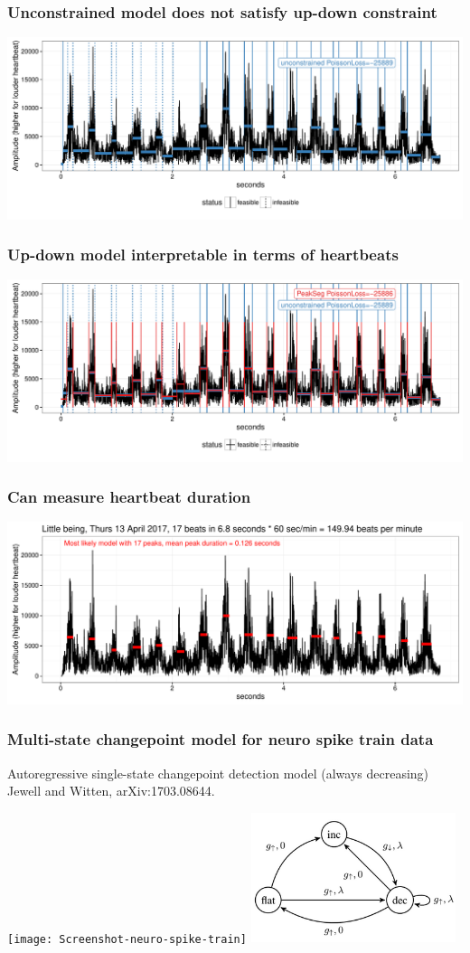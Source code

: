 \documentclass{beamer}
\begin{document}
\begin{frame}
  \frametitle{Unconstrained 
model does not satisfy up-down constraint}
  \includegraphics[width=\textwidth]{figure-heartbeat-unconstrained}
\end{frame}
 
\begin{frame}
  \frametitle{Up-down
model interpretable in terms of heartbeats}
  \includegraphics[width=\textwidth]{figure-heartbeat-PeakSeg}
\end{frame}

\begin{frame}
  \frametitle{Can measure heartbeat duration}
  \includegraphics[width=\textwidth]{figure-heartbeat}
\end{frame}
 
\begin{frame}
  \frametitle{Multi-state changepoint model for neuro spike train
    data}
  Autoregressive single-state changepoint detection model (always
  decreasing) Jewell and Witten, arXiv:1703.08644.

  \texttt{[image: Screenshot-neuro-spike-train]}
  \includegraphics[width=0.45\textwidth]{Screenshot-three-states}
\end{frame}
\end{document}
